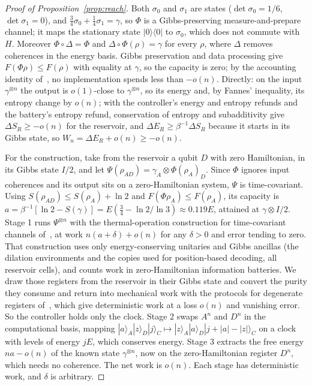 \documentclass[11pt]{article}
\theoremstyle{definition}
\theoremstyle{remark}
\begin{document}
\begin{proof}[Proof of Proposition~\ref{prop:reach}]
Both $\sigma_0$ and $\sigma_1$ are states ($\det\sigma_0=1/6$, $\det\sigma_1=0$), and $\tfrac34\sigma_0+\tfrac14\sigma_1=\gamma$, so $\Phi$ is a Gibbs-preserving measure-and-prepare channel; it maps the stationary state $|0\rangle\langle0|$ to $\sigma_0$, which does not commute with $H$. Moreover $\Phi\circ\Delta=\Phi$ and $\Delta\circ\Phi(\rho)=\gamma$ for every $\rho$, where $\Delta$ removes coherences in the energy basis. Gibbs preservation and data processing give $F(\Phi\rho)\le F(\rho)$ with equality at $\gamma$, so the capacity is zero; by the accounting identity of~\cite{SaveWork}, no implementation spends less than $-o(n)$. Directly: on the input $\gamma^{\otimes n}$ the output is $o(1)$-close to $\gamma^{\otimes n}$, so its energy and, by Fannes' inequality, its entropy change by $o(n)$; with the controller's energy and entropy refunds and the battery's entropy refund, conservation of entropy and subadditivity give $\Delta S_R\ge-o(n)$ for the reservoir, and $\Delta E_R\ge\beta^{-1}\Delta S_R$ because it starts in its Gibbs state, so $W_n=\Delta E_R+o(n)\ge-o(n)$.

For the construction, take from the reservoir a qubit $D$ with zero Hamiltonian, in its Gibbs state $I/2$, and let $\Psi(\rho_{AD})=\gamma_A\otimes\Phi(\rho_A)_D$. Since $\Phi$ ignores input coherences and its output sits on a zero-Hamiltonian system, $\Psi$ is time-covariant. Using $S(\rho_{AD})\le S(\rho_A)+\ln2$ and $F(\Phi\rho_A)\le F(\rho_A)$, its capacity is $a=\beta^{-1}[\ln2-S(\gamma)]=E(\tfrac34-\ln2/\ln3)\approx0.119E$, attained at $\gamma\otimes I/2$. Stage 1 runs $\Psi^{\otimes n}$ with the thermal-operation construction for time-covariant channels of~\cite[Thm.~7.1]{FBB21}, at work $n(a+\delta)+o(n)$ for any $\delta>0$ and error tending to zero. That construction uses only energy-conserving unitaries and Gibbs ancillas (the dilation environments and the copies used for position-based decoding, all reservoir cells), and counts work in zero-Hamiltonian information batteries. We draw those registers from the reservoir in their Gibbs state and convert the purity they consume and return into mechanical work with the protocols for degenerate registers of~\cite{HorodeckiOppenheim13}, which give deterministic work at a loss $o(n)$ and vanishing error. So the controller holds only the clock. Stage 2 swaps $A^n$ and $D^n$ in the computational basis, mapping $|a\rangle_A|z\rangle_D|j\rangle_C\mapsto|z\rangle_A|a\rangle_D|j+|a|-|z|\rangle_C$ on a clock with levels of energy $jE$, which conserves energy. Stage 3 extracts the free energy $na-o(n)$ of the known state $\gamma^{\otimes n}$, now on the zero-Hamiltonian register $D^n$, which needs no coherence. The net work is $o(n)$. Each stage has deterministic work, and $\delta$ is arbitrary.


\end{proof}
\end{document}
